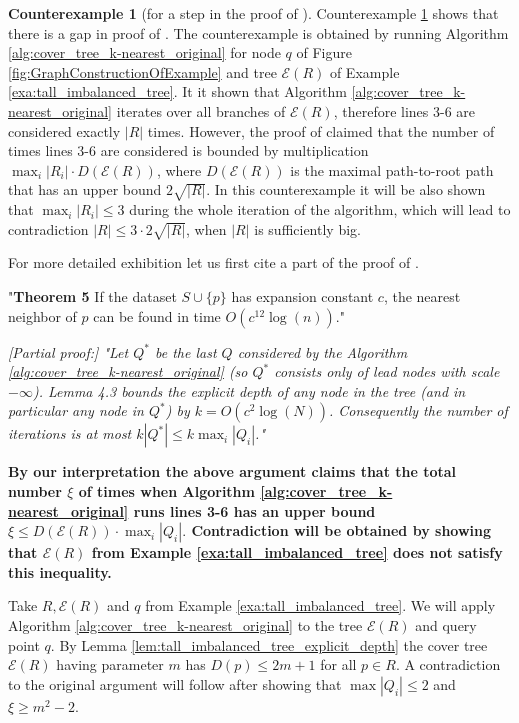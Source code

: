 \documentclass{vgtc}                          %
\numberwithin{algocf}{section}
\theoremstyle{definition}
\theoremstyle{definition}
\theoremstyle{definition}
\newtheorem{cexa}[algocf]{Counterexample}
\theoremstyle{plain}
\newcommand{\T}{\mathcal{E}}
\begin{document}
\begin{cexa}[for a step in the proof of {\cite[Theorem~5]{beygelzimer2006cover}}]
	\label{cexa:original_all_nearest_neighbors_algorithm}
	Counterexample \ref{cexa:original_all_nearest_neighbors_algorithm} shows that there is a gap in proof of \cite[Theorem~6]{beygelzimer2006cover}. The counterexample is obtained by running Algorithm \ref{alg:cover_tree_k-nearest_original} for node $q$ of Figure \ref{fig:GraphConstructionOfExample} and tree $\T(R)$ of Example \ref{exa:tall_imbalanced_tree}. 
    It it shown that Algorithm \ref{alg:cover_tree_k-nearest_original} iterates over all branches of $\T(R)$, therefore  lines 3-6 are considered exactly $|R|$ times. However, the proof of \cite[Theorem~6]{beygelzimer2006cover} claimed that the number of times lines 3-6 are considered is bounded by multiplication $\max_i|R_i| \cdot D(\T(R))$, where $D(\T(R))$ is the maximal path-to-root path that has an upper bound $2\sqrt{|R|}$. In this counterexample it will be also shown that $\max_i|R_i| \leq 3$ during the whole iteration of the algorithm, which will lead to contradiction $|R| \leq 3 \cdot 2\sqrt{|R|}$, when $|R|$ is sufficiently big. 
    
    \medskip
    \noindent 
    
   	For more detailed exhibition let us first cite a part of the proof of  \cite[Theorem~5]{beygelzimer2006cover}.
	
	\medskip
	\noindent
	"\textbf{Theorem 5}
	If the dataset $S \cup \{p\}$ has expansion constant $c$, the nearest neighbor of $p$ can be found in time $O(c^{12}\log(n))$."
	
	\smallskip
	
	
	\emph{[\emph{Partial proof:}] "Let $Q^{*}$ be the last $Q$ considered by the Algorithm \ref{alg:cover_tree_k-nearest_original} (so $Q^{*}$ consists only of lead nodes with scale $-\infty$). Lemma 4.3 bounds the explicit depth of any node in the tree (and in particular any node in $Q^{*}$) by $k = O(c^2 \log (N))$. Consequently the number of iterations is at most $k|Q^{*}| \leq k \max_i|Q_i|$."}
	
	\medskip
	\noindent
	\textbf{By our interpretation the above argument claims that the total number $\xi$ of times when Algorithm \ref{alg:cover_tree_k-nearest_original} runs lines 3-6 has an upper bound $\xi \leq D(\T(R)) \cdot \max_i|Q_i|.$ Contradiction will be obtained by showing that $\T(R)$ from Example \ref{exa:tall_imbalanced_tree} does not satisfy this inequality.} 

	\medskip
	\noindent	
	Take $R,\T(R)$ and $q$ from Example \ref{exa:tall_imbalanced_tree}. We will apply Algorithm \ref{alg:cover_tree_k-nearest_original} to the tree $\T(R)$ and query point $q$. 
	By Lemma \ref{lem:tall_imbalanced_tree_explicit_depth} the cover tree $\T(R)$ having parameter $m$ has $D(p) \leq 2m+1$ for all $p \in R$. A contradiction to the original argument will follow after showing that $\max|Q_i| \leq 2$ and $\xi \geq m^2 - 2$.
	

\end{cexa}
\end{document}
